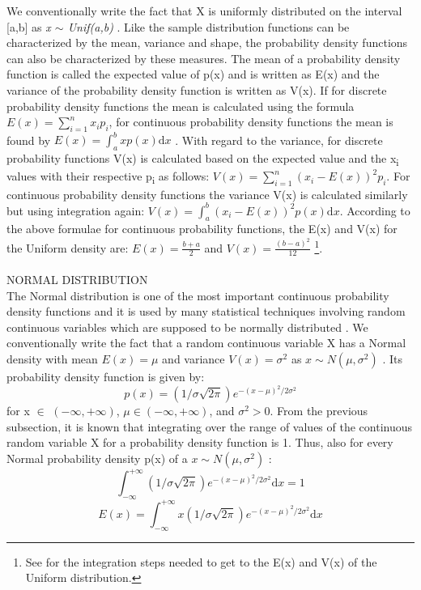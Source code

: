 \documentclass {article}
\begin{document}
We conventionally write the fact that X is uniformly distributed on the interval [a,b] as \textit{x $\sim$ Unif(a,b)} \cite{jackman_bayesian_2009}.
Like the sample distribution functions can be characterized by the mean, variance and shape, the probability density functions can also be characterized by these measures. 
The mean of a probability density function is called the expected value of p(x) and is written as E(x) and the variance of the probability density function is written as V(x). 
If for discrete probability density functions the mean is calculated using the formula $E(x)=\sum_{i=1}^{n}x_i p_i$, for continuous probability density functions the mean is found by $E(x)=\int_a^bxp(x)\mathrm{d}x$ \cite{lial_calculus_2012}.
With regard to the variance, for discrete probability functions V(x) is calculated based on the expected value and the x\textsubscript{i} values with their respective p\textsubscript{i} as follows: $V(x)=\sum_{i=1}^{n}(x_i-E(x))^2p_i$.
 For continuous probability density functions the variance V(x) is calculated similarly but using integration again: $V(x)=\int_a^b(x_i-E(x))^2p(x)\mathrm{d}x$.    
According to the above formulae for continuous probability functions, the E(x) and V(x) for the Uniform density are: $E(x)=\frac{b+a}{2}$ and $V(x)=\frac{(b-a)^2}{12}$ \footnote{See \cite{lial_calculus_2012} for the integration steps needed to get to the E(x) and V(x) of the Uniform distribution.}.   
\\
\\
NORMAL DISTRIBUTION\\
The Normal distribution is one of the most important continuous probability density functions and it is used by many statistical techniques involving random continuous variables which are supposed to be normally distributed \cite{lial_calculus_2012}. 
We conventionally write the fact that a random continuous variable X has a Normal density with mean $E(x)=\mu$ and variance $V(x)=\sigma^2$ as $x\sim N(\mu, \sigma^2)$ \cite{lial_calculus_2012}.
 Its probability density function is given by:
\tab
\begin{equation}   
p(x) = \left(1 /\sigma \sqrt {2\pi } \right) e^{{ - \left( x - \mu  \right)^2 } / {2\sigma ^2 }} 
\end{equation}
for x $\in$ $(-\infty, +\infty)$, $\mu \in (-\infty, +\infty)$, and $\sigma^2 > 0$.        
From the previous subsection, it is known that integrating over the range of values of the continuous random variable X for a probability density function is 1. 
Thus, also for every Normal probability density p(x) of a $x\sim N(\mu, \sigma^2)$ \cite{lial_calculus_2012}: 
\tab
\begin{equation*}
\int_{-\infty}^{+\infty}  \left(1 /\sigma \sqrt {2\pi } \right) e^{{ - \left( x - \mu  \right)^2 } / {2\sigma ^2 }} \mathrm{d} x = 1
\end{equation*}
\tab
\begin{equation*}
E(x) = \int_{-\infty}^{+\infty} x  \left(1 /\sigma \sqrt {2\pi } \right) e^{{ - \left( x - \mu  \right)^2 } / {2\sigma ^2 }} \mathrm{d} x
\end{equation*}
\end{document}
